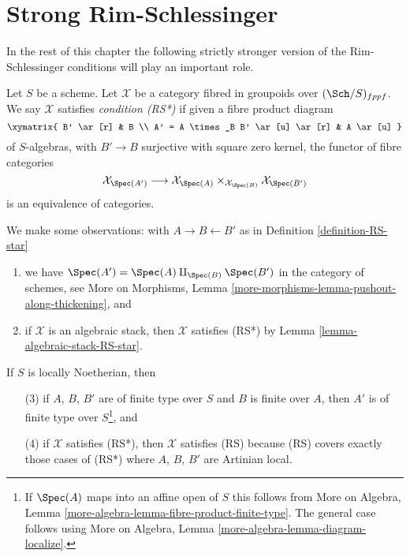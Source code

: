 \section{Strong Rim-Schlessinger}
\label{section-RS-star}

\noindent
In the rest of this chapter the following strictly stronger version
of the Rim-Schlessinger conditions will play an important role.

\begin{definition}
\label{definition-RS-star}
Let $S$ be a scheme. Let $\mathcal{X}$ be a category
fibred in groupoids over $(\Sch/S)_{fppf}$. We say $\mathcal{X}$
satisfies {\it condition (RS*)} if given a fibre product diagram
$$
\xymatrix{
B' \ar[r] & B \\
A' = A \times_B B' \ar[u] \ar[r] & A \ar[u]
}
$$
of $S$-algebras, with $B' \to B$ surjective with square zero kernel,
the functor of fibre categories
$$
\mathcal{X}_{\Spec(A')}
\longrightarrow
\mathcal{X}_{\Spec(A)} \times_{\mathcal{X}_{\Spec(B)}} \mathcal{X}_{\Spec(B')}
$$
is an equivalence of categories.
\end{definition}

\noindent
We make some observations:
with $A \to B \leftarrow B'$ as in Definition \ref{definition-RS-star}
\begin{enumerate}
\item we have $\Spec(A') = \Spec(A) \amalg_{\Spec(B)} \Spec(B')$
in the category of schemes, see
More on Morphisms, Lemma \ref{more-morphisms-lemma-pushout-along-thickening},
and
\item if $\mathcal{X}$ is an algebraic stack, then $\mathcal{X}$ satisfies
(RS*) by Lemma \ref{lemma-algebraic-stack-RS-star}.
\end{enumerate}
If $S$ is locally Noetherian, then
\begin{enumerate}
\item[(3)] if $A$, $B$, $B'$ are of finite type over $S$ and
$B$ is finite over $A$, then $A'$ is of finite type over
$S$\footnote{If $\Spec(A)$ maps into an affine open of $S$
this follows from
More on Algebra, Lemma \ref{more-algebra-lemma-fibre-product-finite-type}.
The general case follows using
More on Algebra, Lemma \ref{more-algebra-lemma-diagram-localize}.}, and
\item[(4)] if $\mathcal{X}$ satisfies (RS*), then $\mathcal{X}$ satisfies (RS)
because (RS) covers exactly those cases of (RS*) where
$A$, $B$, $B'$ are Artinian local.
\end{enumerate}

